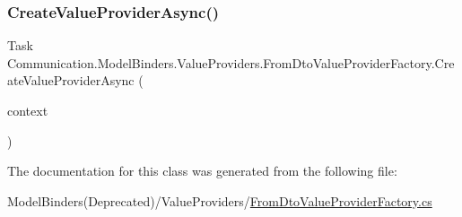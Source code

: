 \subsubsection{\texorpdfstring{Create\+Value\+Provider\+Async()}{CreateValueProviderAsync()}}
{\footnotesize\ttfamily Task Communication.\+Model\+Binders.\+Value\+Providers.\+From\+Dto\+Value\+Provider\+Factory.\+Create\+Value\+Provider\+Async (\begin{DoxyParamCaption}\item[{Value\+Provider\+Factory\+Context}]{context }\end{DoxyParamCaption})}



The documentation for this class was generated from the following file\+:\begin{DoxyCompactItemize}
\item 
Model\+Binders(\+Deprecated)/\+Value\+Providers/\mbox{\hyperlink{_from_dto_value_provider_factory_8cs}{From\+Dto\+Value\+Provider\+Factory.\+cs}}\end{DoxyCompactItemize}
